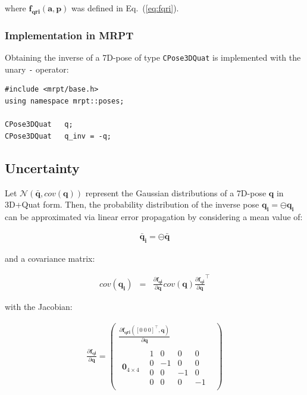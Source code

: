 \documentclass[a4paper,11pt]{report}
\begin{document}
\noindent where $\mathbf{f_{qri}}(\mathbf{a},\mathbf{p})$  was defined in Eq.~(\ref{eq:fqri}).



\subsubsection{Implementation in MRPT}

Obtaining the inverse of a 7D-pose of type \texttt{CPose3DQuat} is implemented 
with the unary \texttt{-} operator:

\begin{lstlisting}
#include <mrpt/base.h> 
using namespace mrpt::poses; 

CPose3DQuat   q;
CPose3DQuat   q_inv = -q;
\end{lstlisting}


\subsection{Uncertainty}

Let $\mathcal{N}(\mathbf{\bar{q}}, cov(\mathbf{q}))$ represent
the Gaussian distributions of a 7D-pose $\mathbf{q}$ in 3D+Quat form. 
Then, the probability distribution of the inverse pose 
$\mathbf{q_i} = \ominus \mathbf{q_i} $ can be approximated via 
linear error propagation by considering a mean value of:

\begin{eqnarray}
\mathbf{\bar{q}_i} = \ominus \mathbf{\bar{q}}
\end{eqnarray}

\noindent and a covariance matrix:

\begin{eqnarray}
cov(\mathbf{q_i}) &=& 
\frac{\partial \mathbf{f_{qi}} }{\partial \mathbf{q}}
cov(\mathbf{q})
\frac{\partial \mathbf{f_{qi}} }{\partial \mathbf{q}} ^\top
\end{eqnarray}

\noindent with the Jacobian:

\begin{eqnarray}
\frac{\partial \mathbf{f_{qi}} }{\partial \mathbf{q}}
= 
\left(
\begin{array}{c}
\frac{\partial \mathbf{f_{qri}}([0~0~0]^\top,\mathbf{q}) }{\partial \mathbf{q}} \\ 
\hline 
 \begin{array}{c|c}
   \mathbf{0}_{4 \times 4} & 
   \begin{array}{rrrr}
    1 & 0 & 0 & 0 \\
    0 & -1 & 0 & 0 \\
    0 & 0 & -1 & 0 \\
    0 & 0 & 0 & -1 
   \end{array}
 \end{array}
\end{array}
\right)
\end{eqnarray}
\end{document}
